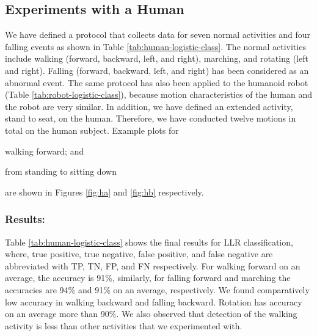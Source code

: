 \documentclass{IEEEtran}
\begin{document}
\subsection{Experiments with a Human}


We have defined a protocol that collects data for seven normal activities and four falling events 
as 
shown in Table \ref{tab:human-logistic-class}. The normal activities include walking 
(forward, backward, left, and right), marching, and rotating (left and right). Falling  (forward, 
backward, left, and right) has been considered as an abnormal event.  The same protocol has also 
been applied to the 
humanoid robot (Table \ref{tab:robot-logistic-class}), because  motion characteristics of the human and the 
robot are very similar. In addition, we 
have  defined an extended activity, stand to seat, on the human. Therefore, we have conducted 
twelve motions in total on the human subject.  Example plots for 
\begin{inparaenum}[($i$)] \item walking forward; and \item from standing to sitting 
down  \end{inparaenum}  are shown in Figures \ref{fig:ha} and \ref{fig:hb} respectively. 


 



\subsubsection{Results:} Table \ref{tab:human-logistic-class} shows the final results for 
LLR classification, where, true positive, true negative, false positive, and false negative are 
abbreviated with TP, TN, FP, and FN respectively. For walking forward on an average, the accuracy is 91\%, 
similarly, for falling forward and marching the accuracies are 94\% and 91\% on an 
average, respectively. We found comparatively low accuracy in walking backward and falling backward. Rotation has accuracy on an average more than 90\%. We also observed that detection of the walking activity is less than other 
activities that we experimented with.  
\end{document}
